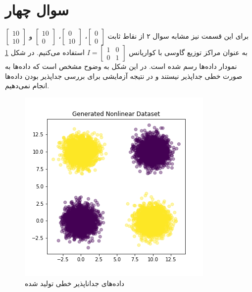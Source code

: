 \documentclass[12pt, a4paper]{article}
\begin{document}
\clearpage

\section*{سوال چهار}

برای این قسمت نیز مشابه سوال ۲ از نقاط ثابت $\begin{bmatrix}0\\0\end{bmatrix}$، $\begin{bmatrix}0\\10\end{bmatrix}$،
$\begin{bmatrix}10\\0\end{bmatrix}$ و $\begin{bmatrix}10\\10\end{bmatrix}$ به عنوان مراکز توزیع گاوسی با کواریانس
$I=\begin{bmatrix}1&0\\0&1\end{bmatrix}$ استفاده می‌کنیم. در شکل \ref{xor_dataset} نمودار داده‌ها رسم شده است.
در این شکل به وضوح مشخص است که داده‌ها به صورت خطی جداپذیر نیستند و در نتیجه آزمایشی برای بررسی جداپذیر بودن
داده‌ها انجام نمی‌دهیم.

\begin{figure}[h]
    \centering
    \includegraphics[scale=0.5]{images/nonlinear_dataset.png}
    \caption{داده‌های جداناپذیر خطی تولید شده}
    \label{xor_dataset}
\end{figure}

\clearpage
\end{document}
